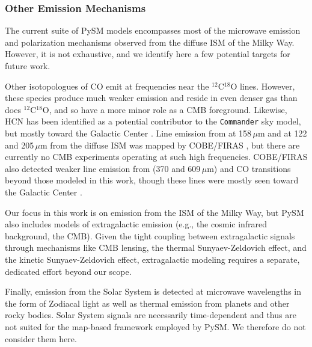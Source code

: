 \documentclass[twocolumn]{aastex631}
\begin{document}
\subsubsection{Other Emission Mechanisms}
The current suite of PySM models encompasses most of the microwave emission and polarization mechanisms observed from the diffuse ISM of the Milky Way. However, it is not exhaustive, and we identify here a few potential targets for future work.

Other isotopologues of CO emit at frequencies near the $^{12}$C$^{18}$O lines. However, these species produce much weaker emission and reside in even denser gas than does $^{12}$C$^{18}$O, and so have a more minor role as a CMB foreground. Likewise, HCN has been identified as a potential contributor to the \texttt{Commander} sky model, but mostly toward the Galactic Center \citep{planck2014-a12}. Line emission from  at 158\,$\mu$m and  at 122 and 205\,$\mu$m from the diffuse ISM was mapped by COBE/FIRAS \citep{Bennett:1994}, but there are currently no CMB experiments operating at such high frequencies. COBE/FIRAS also detected weaker line emission from  (370 and 609\,$\mu$m) and CO transitions beyond those modeled in this work, though these lines were mostly seen toward the Galactic Center \citep{Bennett:1994}. 

Our focus in this work is on emission from the ISM of the Milky Way, but PySM also includes models of extragalactic emission (e.g., the cosmic infrared background, the CMB). Given the tight coupling between extragalactic signals through mechanisms like CMB lensing, the thermal Sunyaev-Zeldovich effect, and the kinetic Sunyaev-Zeldovich effect, extragalactic modeling requires a separate, dedicated effort beyond our scope.

Finally, emission from the Solar System is detected at microwave wavelengths in the form of Zodiacal light as well as thermal emission from planets and other rocky bodies. Solar System signals are necessarily time-dependent and thus are not suited for the map-based framework employed by PySM. We therefore do not consider them here.

\end{document}
